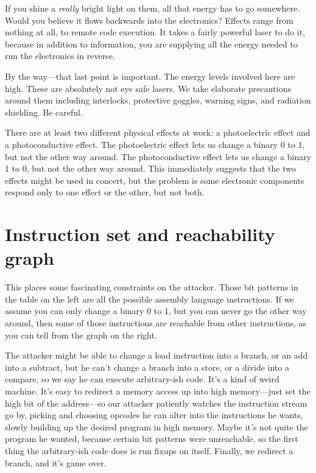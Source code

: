 \documentclass[letterpaper]{article}
\begin{document}
If you shine a \emph{really} bright light on them, all that energy has to go
somewhere. Would you believe it flows backwards into the electronics? Effects
range from nothing at all, to remote code execution. It takes a fairly powerful
laser to do it, because in addition to information, you are supplying all the
energy needed to run the electronics in reverse.

By the way---that last point is important. The energy levels involved here are
high. These are absolutely not eye safe lasers. We take elaborate precautions
around them including interlocks, protective goggles, warning signs, and
radiation shielding. Be careful.

There are at least two different physical effects at work: a photoelectric
effect and a photoconductive effect. The photoelectric effect lets us change a
binary 0 to 1, but not the other way around. The photoconductive effect lets us
change a binary 1 to 0, but not the other way around. This immediately suggests
that the two effects might be used in concert, but the problem is some
electronic components respond only to one effect or the other, but not both.

\section{Instruction set and reachability graph}

This places some fascinating constraints on the attacker. Those bit
patterns in the table on the left are all the possible assembly language
instructions. If we assume you can only change a binary 0 to 1, but you can
never go the other way around, then some of those instructions are reachable
from other instructions, as you can tell from the graph on the right.

The attacker might be able to change a load instruction into a branch, or an
add into a subtract, but he can't change a branch into a store, or a divide
into a compare, so we say he can execute arbitrary-ish code. It's a kind of
weird machine. It's easy to redirect a memory access up into high memory---just
set the high bit of the address---so our attacker patiently watches the
instruction stream go by, picking and choosing opcodes he can alter into the
instructions he wants, slowly building up the desired program in high memory.
Maybe it's not quite the program he wanted, because certain bit patterns were
unreachable, so the first thing the arbitrary-ish code does is run fixups on
itself. Finally, we redirect a branch, and it's game over.
\end{document}
